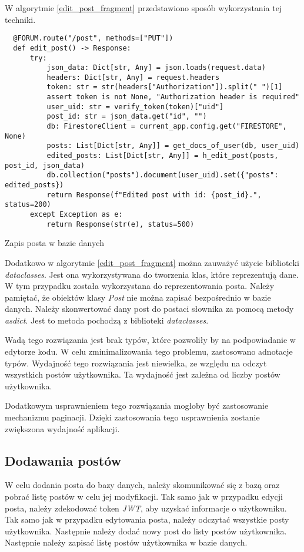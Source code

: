 W algorytmie \ref{edit_post_fragment} przedstawiono sposób wykorzystania tej techniki.

\begin{code}[H]
  \begin{verbatim}
  @FORUM.route("/post", methods=["PUT"])
  def edit_post() -> Response:
      try:
          json_data: Dict[str, Any] = json.loads(request.data)
          headers: Dict[str, Any] = request.headers
          token: str = str(headers["Authorization"]).split(" ")[1]
          assert token is not None, "Authorization header is required"
          user_uid: str = verify_token(token)["uid"]
          post_id: str = json_data.get("id", "")
          db: FirestoreClient = current_app.config.get("FIRESTORE", None)
          posts: List[Dict[str, Any]] = get_docs_of_user(db, user_uid)
          edited_posts: List[Dict[str, Any]] = h_edit_post(posts, post_id, json_data)
          db.collection("posts").document(user_uid).set({"posts": edited_posts})
          return Response(f"Edited post with id: {post_id}.", status=200)
      except Exception as e:
          return Response(str(e), status=500)
  \end{verbatim}
  \caption{Zapis posta w bazie danych}
  \label{edit_post_fragment}
\end{code}

Dodatkowo w algorytmie \ref{edit_post_fragment} można zauważyć użycie biblioteki \textit{dataclasses}. Jest ona wykorzystywana do tworzenia klas, które reprezentują dane. W tym przypadku została wykorzystana do reprezentowania posta. Należy pamiętać, że obiektów klasy \textit{Post} nie można zapisać bezpośrednio w bazie danych. Należy skonwertować dany post do postaci słownika za pomocą metody \textit{asdict}. Jest to metoda pochodzą z biblioteki \textit{dataclasses}.

Wadą tego rozwiązania jest brak typów, które pozwoliły by na podpowiadanie w edytorze kodu. W celu zminimalizowania tego problemu, zastosowano adnotacje typów. Wydajność tego rozwiązania jest niewielka, ze względu na odczyt wszystkich postów użytkownika. Ta wydajność jest zależna od liczby postów użytkownika. 

Dodatkowym usprawnieniem tego rozwiązania mogłoby być zastosowanie mechanizmu paginacji. Dzięki zastosowania tego usprawnienia zostanie zwiększona wydajność aplikacji. 

\subsection{Dodawania postów}
W celu dodania posta do bazy danych, należy skomunikować się z bazą oraz pobrać listę postów w celu jej modyfikacji. Tak samo jak w przypadku edycji posta, należy zdekodować token \textit{JWT}, aby uzyskać informacje o użytkowniku. Tak samo jak w przypadku edytowania posta, należy odczytać wszystkie posty użytkownika. Następnie należy dodać nowy post do listy postów użytkownika. Następnie należy zapisać listę postów użytkownika w bazie danych.

